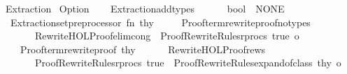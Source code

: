 %
\begin{isabellebody}%
%
%
\isadelimdocument
%
\endisadelimdocument
%
\isatagdocument
%
\isamarkuptrue%
%
\endisatagdocument
{\isafolddocument}%
%
\isadelimdocument
%
\endisadelimdocument
%
\isadelimtheory
%
\endisadelimtheory
%
\isatagtheory
{}\isamarkupfalse%
\ Extraction\isanewline
{}\ Option\isanewline
{}%
\endisatagtheory
{\isafoldtheory}%
%
\isadelimtheory
%
\endisadelimtheory
%
\isadelimdocument
%
\endisadelimdocument
%
\isatagdocument
%
\isamarkuptrue%
%
\endisatagdocument
{\isafolddocument}%
%
\isadelimdocument
%
\endisadelimdocument
%
\isadelimML
%
\endisadelimML
%
\isatagML
{}\isamarkupfalse%
\ {\isacartoucheopen}\isanewline
\ \ Extraction{\isachardot}{\kern0pt}add{\isacharunderscore}{\kern0pt}types\isanewline
\ \ \ \ \ \ {\isacharbrackleft}{\kern0pt}{\isacharparenleft}{\kern0pt}{\isachardoublequote}{\kern0pt}bool{\isachardoublequote}{\kern0pt}{\isacharcomma}{\kern0pt}\ {\isacharparenleft}{\kern0pt}{\isacharbrackleft}{\kern0pt}{\isacharbrackright}{\kern0pt}{\isacharcomma}{\kern0pt}\ NONE{\isacharparenright}{\kern0pt}{\isacharparenright}{\kern0pt}{\isacharbrackright}{\kern0pt}\ {\isacharhash}{\kern0pt}{\isachargreater}{\kern0pt}\isanewline
\ \ Extraction{\isachardot}{\kern0pt}set{\isacharunderscore}{\kern0pt}preprocessor\ {\isacharparenleft}{\kern0pt}fn\ thy\ {\isacharequal}{\kern0pt}{\isachargreater}{\kern0pt}\isanewline
\ \ \ \ Proofterm{\isachardot}{\kern0pt}rewrite{\isacharunderscore}{\kern0pt}proof{\isacharunderscore}{\kern0pt}notypes\isanewline
\ \ \ \ \ \ {\isacharparenleft}{\kern0pt}{\isacharbrackleft}{\kern0pt}{\isacharbrackright}{\kern0pt}{\isacharcomma}{\kern0pt}\ Rewrite{\isacharunderscore}{\kern0pt}HOL{\isacharunderscore}{\kern0pt}Proof{\isachardot}{\kern0pt}elim{\isacharunderscore}{\kern0pt}cong\ {\isacharcolon}{\kern0pt}{\isacharcolon}{\kern0pt}\ Proof{\isacharunderscore}{\kern0pt}Rewrite{\isacharunderscore}{\kern0pt}Rules{\isachardot}{\kern0pt}rprocs\ true{\isacharparenright}{\kern0pt}\ o\isanewline
\ \ \ \ Proofterm{\isachardot}{\kern0pt}rewrite{\isacharunderscore}{\kern0pt}proof\ thy\isanewline
\ \ \ \ \ \ {\isacharparenleft}{\kern0pt}Rewrite{\isacharunderscore}{\kern0pt}HOL{\isacharunderscore}{\kern0pt}Proof{\isachardot}{\kern0pt}rews{\isacharcomma}{\kern0pt}\isanewline
\ \ \ \ \ \ \ Proof{\isacharunderscore}{\kern0pt}Rewrite{\isacharunderscore}{\kern0pt}Rules{\isachardot}{\kern0pt}rprocs\ true\ {\isacharat}{\kern0pt}\ {\isacharbrackleft}{\kern0pt}Proof{\isacharunderscore}{\kern0pt}Rewrite{\isacharunderscore}{\kern0pt}Rules{\isachardot}{\kern0pt}expand{\isacharunderscore}{\kern0pt}of{\isacharunderscore}{\kern0pt}class\ thy{\isacharbrackright}{\kern0pt}{\isacharparenright}{\kern0pt}\ o\isanewline

\end{isabellebody}
